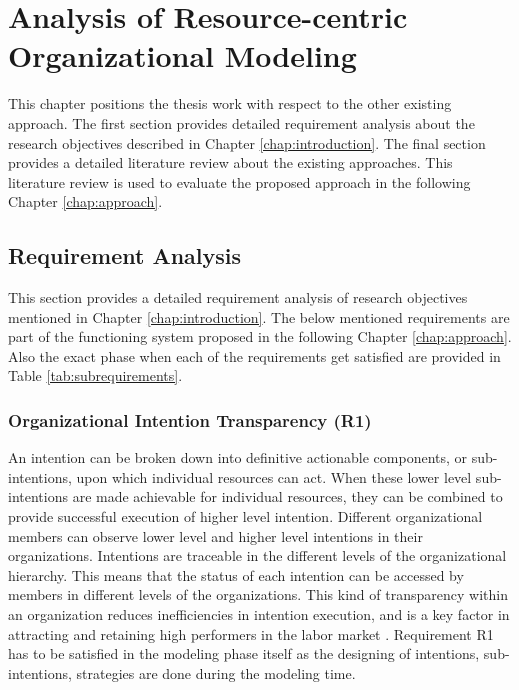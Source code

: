\chapter{Analysis of Resource-centric Organizational Modeling}
\label{chap:analysis}
This chapter positions the thesis work with respect to the other existing approach. The first section provides detailed requirement analysis about the research objectives described in Chapter \ref{chap:introduction}. The final section provides a detailed literature review about the existing approaches. This literature review is used to evaluate the proposed approach in the following Chapter \ref{chap:approach}.

\section{Requirement Analysis}
\label{sec:requirementssupoorting}
This section provides a detailed requirement analysis of research objectives mentioned in Chapter \ref{chap:introduction}. The below mentioned requirements are part of the functioning system proposed in the following Chapter \ref{chap:approach}. Also the exact phase when each of the requirements get satisfied are provided in Table \ref{tab:subrequirements}.

\subsection{Organizational Intention Transparency (R1)}
An intention can be broken down into definitive actionable components, or sub-intentions, upon which individual resources can act. When these lower level sub-intentions are made  achievable for individual resources, they can be combined to provide successful execution of higher level intention. Different organizational members can observe lower level and higher level intentions in their organizations. Intentions are traceable in the different levels of the organizational hierarchy. This means that the status of each intention can be accessed by members in different levels of the organizations. This kind of transparency within an organization reduces inefficiencies in intention execution, and is a key factor in attracting and retaining high  performers in the labor market \cite{McManus2007}. Requirement R1 has to be satisfied in the modeling phase itself as the designing of intentions, sub-intentions, strategies are done during the modeling time. 


